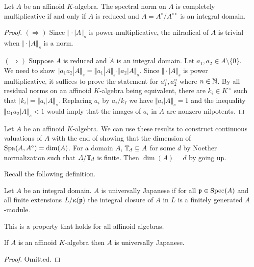 \begin{proposition}\label{prop: multiplicative iff reduced}
    Let $A$ be an affinoid $K$-algebra. The spectral norm on $A$ is completely multiplicative if and only if $A$ is reduced and $\widetilde{A}=A^{\circ}/A^{\circ\circ}$ is an integral domain. 
\end{proposition}
\begin{proof}
    $(\Rightarrow)$ Since $\Vert\cdot|A\Vert_{s}$ is power-multiplicative, the nilradical of $A$ is trivial when $\Vert\cdot|A\Vert_{s}$ is a norm. 

    $(\Rightarrow)$ Suppose $A$ is reduced and $\widetilde{A}$ is an integral domain. Let $a_{1},a_{2}\in A\setminus\{0\}$. We need to show $\Vert a_{1}a_{2}|A\Vert_{s}=\Vert a_{1}|A\Vert_{s}\cdot\Vert a_{2}|A\Vert_{s}$. Since $\Vert\cdot|A\Vert_{s}$ is power multiplicative, it suffices to prove the statement for $a_{1}^{n},a_{2}^{n}$ where $n\in\mathbb{N}$. By all residual norms on an affinoid $K$-algebra being equivalent, there are $k_{i}\in K^{\times}$ such that $|k_{i}|=\Vert a_{i}|A\Vert_{s}$. Replacing $a_{i}$ by $a_{i}/k_{I}$ we have $\Vert a_{i}|A\Vert_{s}=1$ and the inequality $\Vert a_{1}a_{2}|A\Vert_{s}<1$ would imply that the images of $a_{i}$ in $\widetilde{A}$ are nonzero nilpotents. 
\end{proof}
\begin{remark}
    Let $A$ be an affinoid $K$-algebra. We can use these results to construct continuous valuations of $A$ with the end of showing that the dimension of $\mathrm{Spa}(A,A^{\circ})=\dim(A)$. For a domain $A$, $\mathbb{T}_{d}\subseteq A$ for some $d$ by Noether normalization such that $A/\mathbb{T}_{d}$ is finite. Then $\dim(A)=d$ by going up. 
\end{remark}
Recall the following definition. 
\begin{definition}\label{def: universally Japanese}
    Let $A$ be an integral domain. $A$ is universally Japanese if for all $\mathfrak{p}\in\operatorname{Spec}(A)$ and all finite extensions $L/\kappa(\mathfrak{p})$ the integral closure of $A$ in $L$ is a finitely generated $A$-module. 
\end{definition}
This is a property that holds for all affinoid algebras. 
\begin{proposition}\label{prop: affinoid implies univ Jap}
    If $A$ is an affinoid $K$-algebra then $A$ is universally Japanese. 
\end{proposition}
\begin{proof}
    Omitted. 
\end{proof}
